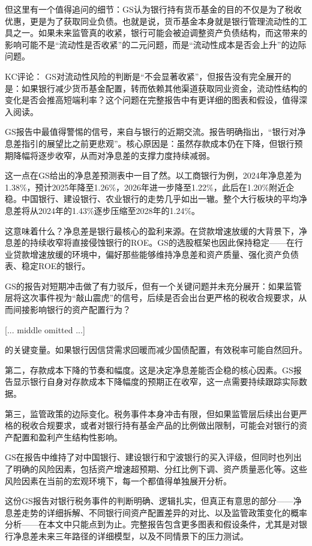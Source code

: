 \documentclass[11pt]{ctexart}
\begin{document}
但这里有一个值得追问的细节：GS认为银行持有货币基金的目的不仅是为了税收优惠，更是为了获取同业负债。也就是说，货币基金本身就是银行管理流动性的工具之一。如果未来监管真的收紧，银行可能会被迫调整资产负债结构，而这带来的影响可能不是“流动性是否收紧”的二元问题，而是“流动性成本是否会上升”的边际问题。

KC评论： GS对流动性风险的判断是“不会显著收紧”，但报告没有完全展开的是：如果银行减少货币基金配置，转而依赖其他渠道获取同业资金，流动性结构的变化是否会推高短端利率？这个问题在完整报告中有更详细的图表和假设，值得深入阅读。

GS报告中最值得警惕的信号，来自与银行的近期交流。报告明确指出，“银行对净息差指引的展望比之前更悲观”。核心原因是：虽然存款成本仍在下降，但银行预期降幅将逐步收窄，从而对净息差的支撑力度持续减弱。

这一点在GS给出的净息差预测表中一目了然。以工商银行为例，2024年净息差为1.38\%，预计2025年降至1.26\%，2026年进一步降至1.22\%，此后在1.20\%附近企稳。中国银行、建设银行、农业银行的走势几乎如出一辙。整个大行板块的平均净息差将从2024年的1.43\%逐步压缩至2028年的1.24\%。

这意味着什么？净息差是银行最核心的盈利来源。在贷款增速放缓的大背景下，净息差的持续收窄将直接侵蚀银行的ROE。GS的选股框架也因此保持稳定——在行业贷款增速放缓的环境中，偏好那些能够维持净息差和资产质量、强化资产负债表、稳定ROE的银行。

GS的报告对短期冲击做了有力驳斥，但有一个关键问题并未充分展开：如果监管层将这次事件视为“敲山震虎”的信号，后续是否会出台更严格的税收合规要求，从而间接影响银行的资产配置行为？


[... middle omitted ...]

的关键变量。如果银行因信贷需求回暖而减少国债配置，有效税率可能自然回升。

第二，存款成本下降的节奏和幅度。这是决定净息差能否企稳的核心因素。GS报告显示银行自身对存款成本下降幅度的预期正在收窄，这一点需要持续跟踪实际数据。

第三，监管政策的边际变化。税务事件本身冲击有限，但如果监管层后续出台更严格的税收合规要求，或者对银行持有基金产品的比例做出限制，可能会对银行的资产配置和盈利产生结构性影响。

GS在报告中维持了对中国银行、建设银行和宁波银行的买入评级，但同时也列出了明确的风险因素，包括资产增速超预期、分红比例下调、资产质量恶化等。这些风险因素在当前的宏观环境下，每一个都值得单独展开分析。

这份GS报告对银行税务事件的判断明确、逻辑扎实，但真正有意思的部分——净息差走势的详细拆解、不同银行间资产配置差异的对比、以及监管政策变化的概率分析——在本文中只能点到为止。完整报告包含更多图表和假设条件，尤其是对银行净息差未来三年路径的详细模型，以及不同情景下的压力测试。
\end{document}
